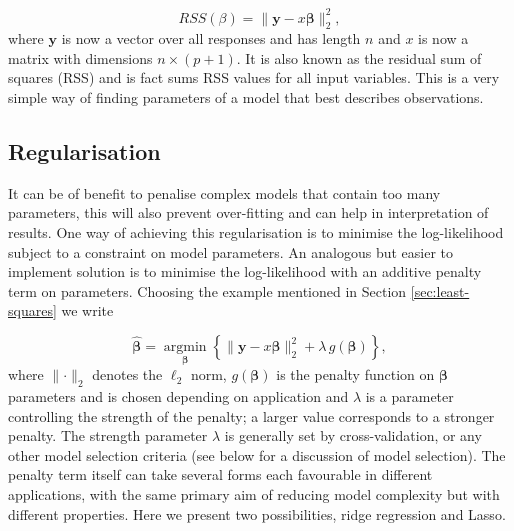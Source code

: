 
\begin{equation}
  \label{eq:rss-ls}
  RSS(\beta) = \lVert \mathbf{y} - {x}\boldsymbol{\beta}\lVert^2_2,
\end{equation}
where $\mathbf{y}$ is now a vector over all responses and has length $n$ and ${x}$ is now a matrix with dimensions $n \times (p + 1)$. It is also known as the residual sum of squares (RSS) and is fact sums RSS values for all input variables. This is a very simple way of finding parameters of a model that best describes observations.

\subsection{Regularisation}
\label{sec:penalisation}

It can be of benefit to penalise complex models that contain too many parameters, this will also prevent over-fitting and can help in interpretation of results. One way of achieving this regularisation is to  minimise the log-likelihood subject to a constraint on model parameters. An analogous but easier to implement solution is to minimise the log-likelihood with an additive penalty term on parameters. Choosing the example mentioned in Section \ref{sec:least-squares} we write

\begin{equation}
  \label{eq:pen-log-lik}
  \hat{\boldsymbol{\beta}} = \underset{\boldsymbol{\beta}}{\operatorname{argmin}}  \left\lbrace \lVert \mathbf{y} - x\boldsymbol{\beta}\lVert^2_2 + \lambda\, g(\boldsymbol{\beta}) \right\rbrace,
\end{equation}
where $\lVert  \cdot \rVert_2$ denotes the $\ell_2$ norm, $g(\boldsymbol{\beta})$ is the penalty function on $\boldsymbol{\beta}$ parameters and is chosen depending on application and $\lambda$ is a parameter controlling the strength of the penalty; a larger value corresponds to a stronger penalty. The strength parameter $\lambda$ is generally set by cross-validation, or any other model selection criteria (see below for a discussion of model selection). The penalty term itself can take several forms each favourable in different applications, with the same primary aim of reducing model complexity but with different properties. Here we present two possibilities, ridge regression and Lasso.


